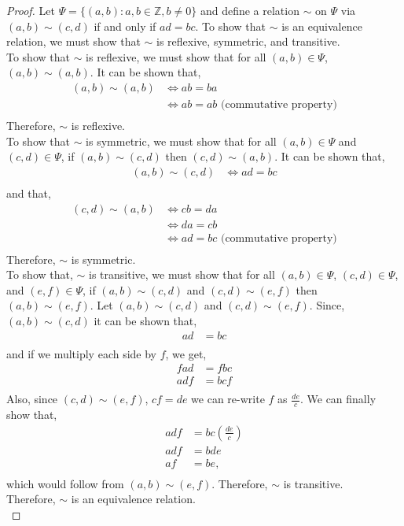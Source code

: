 \documentclass[12pt]{article}
\begin{document}
	\begin{proof}
	Let $\Psi = \{(a,b): a,b \in \mathbb{Z}, b\neq 0\}$ and define a relation $\sim$ on $\Psi$ via $(a,b) \sim (c,d)$ if and only if
	$ad=bc$. To show that $\sim$ is an equivalence relation, we must show that $\sim$ is reflexive, symmetric, and transitive.\\

	To show that $\sim$ is reflexive, we must show that for all $(a,b) \in \Psi$, $(a,b) \sim (a,b)$.
	It can be shown that, 
	\begin{align*}
		(a,b) \sim (a,b) &\Leftrightarrow ab=ba\\
				 &\Leftrightarrow ab=ab \text{ (commutative property)}\\
	\end{align*}
	Therefore, $\sim$ is reflexive.\\

	To show that $\sim$ is symmetric, we must show that for all $(a,b) \in \Psi$ and $(c,d) \in \Psi$, if $(a,b) \sim (c,d)$ then $(c,d) \sim (a,b)$.
	It can be shown that,
	\begin{align*}
		(a,b) \sim (c,d) &\Leftrightarrow ad=bc\\
	\end{align*}
	and that,
	\begin{align*}
		(c,d) \sim (a,b) &\Leftrightarrow cb=da\\
				 &\Leftrightarrow da=cb\\
				 &\Leftrightarrow ad=bc \text{ (commutative property)}\\
	\end{align*}
	Therefore, $\sim$ is symmetric.\\

	To show that, $\sim$ is transitive, we must show that for all $(a,b) \in \Psi$, $(c,d) \in \Psi$, and $(e,f) \in \Psi$, if $(a,b) \sim (c,d)$ and $(c,d) \sim (e,f)$ then $(a,b) \sim (e,f)$.
	Let $(a,b) \sim (c,d)$ and $(c,d) \sim (e,f)$.
	Since, $(a,b)\sim(c,d)$ it can be shown that,
	\begin{align*}
		ad&=bc\\
	\end{align*}
	and if we multiply each side by $f$, we get,
	\begin{align*}
		fad&=fbc\\
		adf&=bcf\\
	\end{align*}
	Also, since $(c,d)\sim(e,f)$, $cf=de$ we can re-write $f$ as $\frac{de}{c}$. We can finally show that,
	\begin{align*}
		adf&=bc(\frac{de}{c})\\
		adf&=bde\\
		af&=be \text{,}\\
	\end{align*}
	which would follow from $(a,b)\sim(e,f)$. Therefore, $\sim$ is transitive.\\

	Therefore, $\sim$ is an equivalence relation.\\
\end{proof}
		
\end{document}
